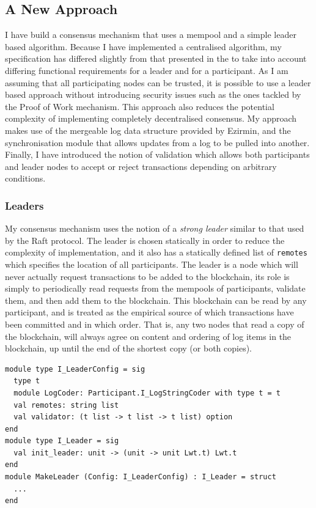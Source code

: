\documentclass[12pt,a4paper,twoside,openright]{report}
\begin{document}
		\subsection{A New Approach}
		I have build a consensus mechanism that uses a mempool and a simple leader based algorithm. 
		Because I have implemented a centralised algorithm, my specification has differed slightly from that presented in the  to take into account differing functional requirements for a leader and for a participant.
		As I am assuming that all participating nodes can be trusted, it is possible to use a leader based approach without introducing security issues such as the ones tackled by the Proof of Work mechanism. 
		This approach also reduces the potential complexity of implementing completely decentralised consensus.
		My approach makes use of the mergeable log data structure provided by Ezirmin, and the synchronisation module that allows updates from a log to be pulled into another.
		Finally, I have introduced the notion of validation which allows both participants and leader nodes to accept or reject transactions depending on arbitrary conditions.
		
			\subsubsection*{Leaders}
			My consensus mechanism uses the notion of a \textit{strong leader} similar to that used by the Raft protocol. 
			The leader is chosen statically in order to reduce the complexity of implementation, and it also has a statically defined list of \texttt{remotes} which specifies the location of all participants.
			The leader is a node which will never actually request transactions to be added to the blockchain, its role is simply to periodically read requests from the mempools of participants, validate them, and then add them to the blockchain.
			This blockchain can be read by any participant, and is treated as the empirical source of which transactions have been committed and in which order. 
			That is, any two nodes that read a copy of the blockchain, will always agree on content and ordering of log items in the blockchain, up until the end of the shortest copy (or both copies).\\

			\begin{lstlisting}
module type I_LeaderConfig = sig
  type t
  module LogCoder: Participant.I_LogStringCoder with type t = t    
  val remotes: string list
  val validator: (t list -> t list -> t list) option
end
module type I_Leader = sig
  val init_leader: unit -> (unit -> unit Lwt.t) Lwt.t
end
module MakeLeader (Config: I_LeaderConfig) : I_Leader = struct
  ...
end
			\end{lstlisting}
\end{document}
